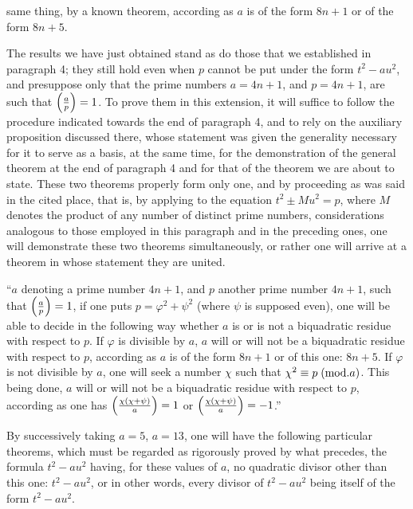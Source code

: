 \noindent
same thing, by a known theorem, according as $a$ is of the form $8n+1$
or of the form $8n+5$.
\par\indent
The results we have just obtained stand as do those that
we established in paragraph 4; they still hold even when $p$
cannot be put under the form $t^2-au^2$, and presuppose only that the
prime numbers $a=4n+1$, and $p=4n+1$, are such that $\left(\frac{a}{p}\right)=1$. To
prove them in this extension, it will suffice to follow the procedure
indicated towards the end of paragraph 4, and to rely on the auxiliary
proposition discussed there, whose statement was given the generality
necessary for it to serve as a basis, at the same time, for the
demonstration of the general theorem at the end of paragraph 4 and for that of the theorem we
are about to state. These two theorems properly form only one, and
by proceeding as was said in the cited place, that is, by applying to
the equation $t^2\pm Mu^2=p$, where $M$ denotes the product of any number of
distinct prime numbers, considerations analogous to those employed
in this paragraph and in the preceding ones, one will demonstrate
these two theorems simultaneously, or rather one will arrive at a theorem in whose statement
they are united.
\par\indent
“$a$ denoting a prime number $4n+1$, and $p$ another prime number
$4n+1$, such that $\left(\frac{a}{p}\right)=1$, if one puts $p=\varphi^2+\psi^2$ (where $\psi$ is supposed even), one
will be able to decide in the following way whether $a$ is or is not a biquadratic
residue with respect to $p$. If $\varphi$ is divisible by $a$, $a$ will or will not be a
biquadratic residue with respect to $p$, according as $a$ is of the form $8n+1$ or of
this one: $8n+5$. If $\varphi$ is not divisible by $a$, one will seek a number $\chi$ such
that $\chi^2\equiv p\;(\mathrm{mod}.a)$. This being done, $a$ will or will not be a biquadratic
residue with respect to $p$, according as one has $\left(\frac{\chi(\chi+\psi)}{a}\right)=1$ or
$\left(\frac{\chi(\chi+\psi)}{a}\right)=-1$.”
\par\indent
By successively taking $a=5$, $a=13$, one will have the following particular
theorems, which must be regarded as rigorously proved by what
precedes, the formula $t^2-au^2$ having, for these values of $a$, no quadratic
divisor other than this one: $t^2-au^2$, or in other words, every divisor of $t^2-au^2$
being itself of the form $t^2-au^2$.
